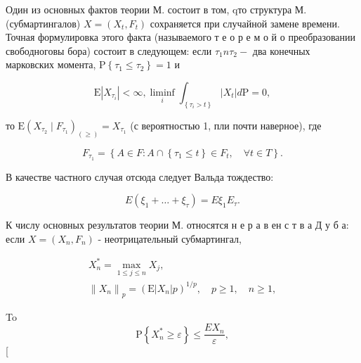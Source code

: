 \documentclass[10pt]{article}
\begin{document}
Один из основных фактов теории М. состоит в том, qто структура М. (субмартингалов) $X=\left(X_{t}, F_{t}\right)$ сохраняется при случайной замене времени. Точная формулировка этого факта (называемого т е о р е м о й о преобразовании свободноговы бора) состоит в следующем: если $\tau_{1} n \tau_{2}-$ два конечных марковских момента, $\mathrm{P}\left\{\tau_{1} \leqslant \tau_{2}\right\}=1$ и



\[

\mathrm{E}\left|X_{\tau_{i}}\right|<\infty, \liminf _{i} \int_{\left\{\tau_{i}>t\right\}}\left|X_{t}\right| d \mathrm{P}=0,

\]



то $\mathrm{E}\left(X_{\tau_{2}} \mid F_{\tau_{1}}\right)_{(\geqslant)}=X_{\tau_{1}}$ (с вероятностью 1, пли почти наверное), где



\[

F_{\tau_{1}}=\left\{A \in F: A \cap\left\{\tau_{1} \leqslant t\right\} \in F_{t}, \quad \forall t \in T\right\} .

\]



В качестве частного случая отсюда следует Вальда тождество:



\[

E\left(\xi_{1}+\ldots+\xi_{\tau}\right)=E \xi_{1} E_{\tau} .

\]



$К$ числу основных результатов теории М. относятся н е р а в ен с т в а Д у б а: если $X=\left(X_{n}, F_{n}\right)$ - неотрицательный субмартингал,



\[

\begin{gathered}

X_{n}^{*}=\max _{1 \leqslant j \leqslant n} X_{j}, \\

\left\|X_{n}\right\|_{p}=\left(\mathrm{E}\left|X_{n}\right| p\right)^{1 / p}, \quad p \geqslant 1, \quad n \geqslant 1,

\end{gathered}

\]



To\[

\mathrm{P}\left\{X_{n}^{*} \geqslant \varepsilon\right\} \leqslant \frac{E X_{n}}{\varepsilon},

\][
\end{document}
